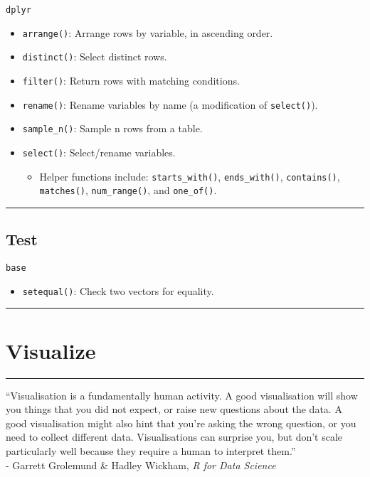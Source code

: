 \documentclass[]{book}
\providecommand{\tightlist}{%
  \setlength{\itemsep}{0pt}\setlength{\parskip}{0pt}}
\theoremstyle{definition}
\theoremstyle{definition}
\theoremstyle{definition}
\theoremstyle{remark}
\begin{document}
\texttt{dplyr}

\begin{itemize}
\tightlist
\item
  \texttt{arrange()}: Arrange rows by variable, in ascending order.
\item
  \texttt{distinct()}: Select distinct rows.
\item
  \texttt{filter()}: Return rows with matching conditions.
\item
  \texttt{rename()}: Rename variables by name (a modification of
  \texttt{select()}).
\item
  \texttt{sample\_n()}: Sample n rows from a table.
\item
  \texttt{select()}: Select/rename variables.

  \begin{itemize}
  \tightlist
  \item
    Helper functions include: \texttt{starts\_with()},
    \texttt{ends\_with()}, \texttt{contains()}, \texttt{matches()},
    \texttt{num\_range()}, and \texttt{one\_of()}.
  \end{itemize}
\end{itemize}

\begin{center}\rule{0.5\linewidth}{\linethickness}\end{center}

\section{Test}\label{test}

\texttt{base}

\begin{itemize}
\tightlist
\item
  \texttt{setequal()}: Check two vectors for equality.
\end{itemize}

\begin{center}\rule{0.5\linewidth}{\linethickness}\end{center}

\chapter{Visualize}\label{visualize}

\begin{center}\rule{0.5\linewidth}{\linethickness}\end{center}

``Visualisation is a fundamentally human activity. A good visualisation
will show you things that you did not expect, or raise new questions
about the data. A good visualisation might also hint that you're asking
the wrong question, or you need to collect different data.
Visualisations can surprise you, but don't scale particularly well
because they require a human to interpret them.''\\
- Garrett Grolemund \& Hadley Wickham, \emph{R for Data Science}
\end{document}
